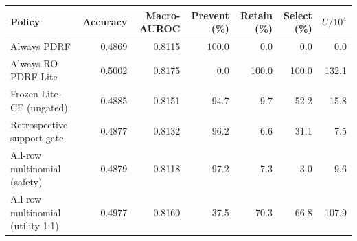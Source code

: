 \begin{tabular}{lrrrrrr}
\toprule
Policy & Accuracy & Macro-AUROC & Prevent (\%) & Retain (\%) & Select (\%) & $U/10^4$ \\
\midrule
Always PDRF & 0.4869 & 0.8115 & 100.0 & 0.0 & 0.0 & 0.0 \\
Always RO-PDRF-Lite & 0.5002 & 0.8175 & 0.0 & 100.0 & 100.0 & 132.1 \\
Frozen Lite-CF (ungated) & 0.4885 & 0.8151 & 94.7 & 9.7 & 52.2 & 15.8 \\
Retrospective support gate & 0.4877 & 0.8132 & 96.2 & 6.6 & 31.1 & 7.5 \\
All-row multinomial (safety) & 0.4879 & 0.8118 & 97.2 & 7.3 & 3.0 & 9.6 \\
All-row multinomial (utility 1:1) & 0.4977 & 0.8160 & 37.5 & 70.3 & 66.8 & 107.9 \\
\bottomrule
\end{tabular}
